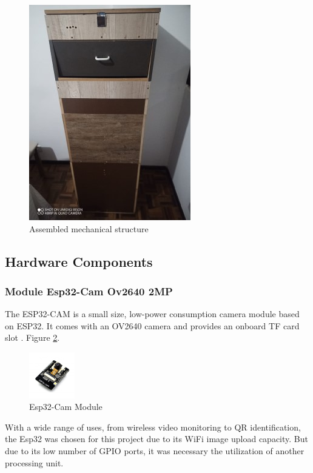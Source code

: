 \documentclass[a4paper,11pt]{article}
\begin{document}
\begin{figure}[H]
  \centering
  \includegraphics[scale=0.7]{Figures/Full Structure.jpg}
  \caption{\small{Assembled mechanical structure}}
  \label{fig:fullBody}
\end{figure}

\subsection{Hardware Components}
\label{subsec:Hardware}
\subsubsection{Module Esp32-Cam Ov2640 2MP}
\label{subsubsec:esp32}
The ESP32-CAM is a small size, low-power consumption camera module based on ESP32. It comes with an OV2640 camera and provides an onboard TF card slot \cite{evelta}. Figure \ref{fig:Esp32}.

\begin{figure}[H]
  \centering
  \includegraphics[width=2cm]{Figures/esp32cam-1024x1024.jpg}
  \caption{\small{Esp32-Cam Module}}
  \label{fig:Esp32}
\end{figure}

With a wide range of uses, from wireless video monitoring to QR identification, the Esp32 was chosen for this project due to its WiFi image upload capacity. But due to its low number of GPIO ports, it was necessary the utilization of another processing unit.
\end{document}
